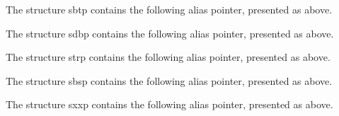 \noindent
The structure {\F sbtp} contains the following alias pointer, presented as
above.

\begin{vlist}
\end{vlist}

\noindent
The structure {\F sdbp} contains the following alias pointer, presented as
above.

\begin{vlist}
\end{vlist}

\noindent
The structure {\F strp} contains the following alias pointer, presented as
above.

\begin{vlist}
\end{vlist}

\noindent
The structure {\F sbsp} contains the following alias pointer, presented as
above.

\begin{vlist}
\end{vlist}

\noindent
The structure {\F sxxp} contains the following alias pointer, presented as
above.

\begin{vlist}
\end{vlist}
